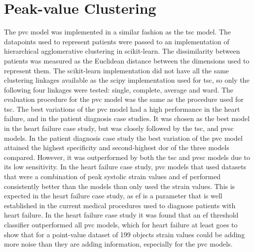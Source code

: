 \section{Peak-value Clustering}
The \acrshort{pvc} model was implemented in a similar fashion as the \acrshort{tsc} model.
The datapoints used to represent patients were passed to an implementation of hierarchical agglomerative clustering in scikit-learn. The dissimilarity between patients was measured as the Euclidean distance between the dimensions used to represent them. The scikit-learn implementation did not have all the same clustering linkages available as the scipy implementation used for \acrshort{tsc}, so only the following four linkages were tested: single, complete, average and ward. The evaluation procedure for the \acrshort{pvc} model was the same as the procedure used for \acrshort{tsc}. \bigskip
The best variations of the \acrshort{pvc} model had a high performance in the heart failure, and in the patient diagnosis case studies. It was chosen as the best model in the heart failure case study, but was closely followed by the \acrshort{tsc}, and \acrshort{pvsc} models. In the patient diagnosis case study the best variation of the \acrshort{pvc} model attained the highest specificity and second-highest \acrshort{dor} of the three models compared. However, it was outperformed by both the \acrshort{tsc} and \acrshort{pvsc} models due to its low sensitivity. \bigskip
In the heart failure case study, \acrshort{pvc} models that used datasets that were a combination of peak systolic strain values and \acrshort{ef} performed consistently better than the models than only used the strain values. This is expected in the heart failure case study, as \acrshort{ef} is a parameter that is well established in the current medical procedures used to diagnose patients with heart failure. In the heart failure case study it was found that an \acrshort{ef} threshold classifier outperformed all \acrshort{pvc} models, which for heart failure at least goes to show that for a point-value dataset of 199 objects strain values could be adding more noise than they are adding information, especially for the \acrshort{pvc} models. \bigskip
